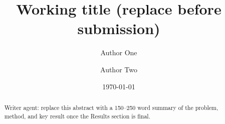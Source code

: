 \documentclass[11pt]{article}
\title{Working title (replace before submission)}
\author{Author One \and Author Two}
\date{\today}
\theoremstyle{definition}
\theoremstyle{remark}
\begin{document}
\maketitle

\begin{abstract}
Writer agent: replace this abstract with a 150--250 word summary of
the problem, method, and key result once the Results section is final.
\end{abstract}









\end{document}
